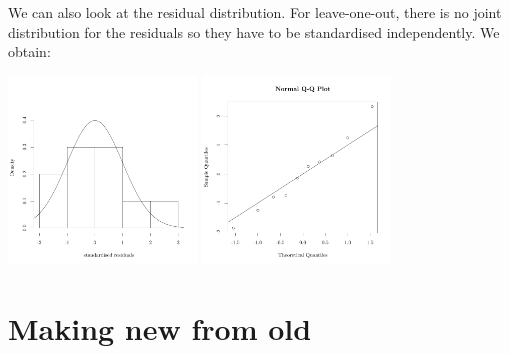 \documentclass{beamer}
\begin{document}
\begin{frame}{}
We can also look at the residual distribution. For leave-one-out, there is no joint distribution for the residuals so they have to be standardised independently. We obtain: 
\begin{center}
\includegraphics[height=5cm]{figures/R/VALID_crossvalhist} \qquad
\includegraphics[height=5cm]{figures/R/VALID_crossvalqqplot}
\end{center}
\end{frame}


\section{Making new from old}
\subsection{}
\end{document}
